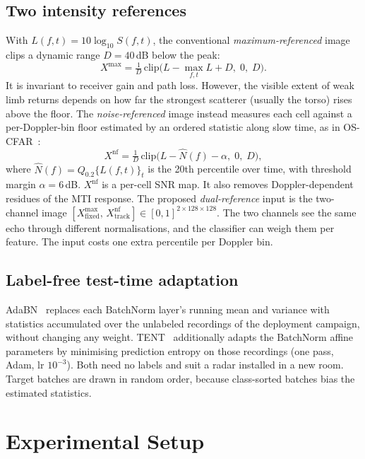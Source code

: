 \documentclass[11pt,a4paper]{article}
\begin{document}
\subsection{Two intensity references}
With $L(f,t)=10\log_{10}S(f,t)$, the conventional \emph{maximum-referenced} image clips a dynamic range $D=40$\,dB below the peak:
\begin{equation}
X^{\max}=\tfrac{1}{D}\,\mathrm{clip}\big(L-\max_{f,t}L+D,\;0,\;D\big).
\end{equation}
It is invariant to receiver gain and path loss. However, the visible extent of weak limb returns depends on how far the strongest scatterer (usually the torso) rises above the floor. The \emph{noise-referenced} image instead measures each cell against a per-Doppler-bin floor estimated by an ordered statistic along slow time, as in OS-CFAR~\cite{rohling1983cfar}:
\begin{equation}
X^{\mathrm{nf}}=\tfrac{1}{D}\,\mathrm{clip}\big(L-\hat N(f)-\alpha,\;0,\;D\big),
\end{equation}
where $\hat N(f)=Q_{0.2}\{L(f,t)\}_t$ is the 20th percentile over time, with threshold margin $\alpha=6$\,dB. $X^{\mathrm{nf}}$ is a per-cell SNR map. It also removes Doppler-dependent residues of the MTI response. The proposed \emph{dual-reference} input is the two-channel image $[X^{\max}_{\text{fixed}},\,X^{\mathrm{nf}}_{\text{track}}]\in[0,1]^{2\times128\times128}$. The two channels see the same echo through different normalisations, and the classifier can weigh them per feature. The input costs one extra percentile per Doppler bin.

\subsection{Label-free test-time adaptation}
AdaBN~\cite{li2018adabn} replaces each BatchNorm layer's running mean and variance with statistics accumulated over the unlabeled recordings of the deployment campaign, without changing any weight. TENT~\cite{wang2021tent} additionally adapts the BatchNorm affine parameters by minimising prediction entropy on those recordings (one pass, Adam, lr $10^{-3}$). Both need no labels and suit a radar installed in a new room. Target batches are drawn in random order, because class-sorted batches bias the estimated statistics.

\section{Experimental Setup}\label{sec:setup}
\end{document}
